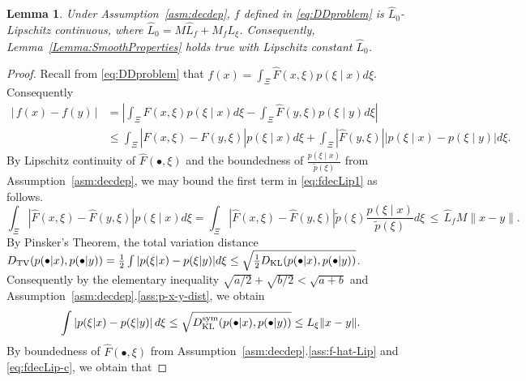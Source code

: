 \documentclass[11pt,reqno]{amsart}
\newcommand{\1}{{\bf 1}}
\newcommand{\2}{{\bf 2}}
\newcommand{\mr}[1]{{\color{blue}#1}}
\newcommand{\pc}[1]{{\color{cyan}#1}}
\newcommand{\us}[1]{\textcolor{red}{#1}}
\newcommand{\lln}{\left|}
\newcommand{\rrn}{\right|}
\numberwithin{equation}{section}
\newtheorem{lemma}{Lemma}[section]
\theoremstyle{remark}
\newcommand{\beq}{\begin{equation}}
\newcommand{\eeq}{\end{equation}}
\begin{document}
{{						
						\begin{lemma}\label{lem:f-decdep1-Lip}
							Under Assumption~\ref{asm:decdep}, $f$ defined in \eqref{eq:DDproblem} is $\hat{L}_0$-Lipschitz continuous, where $\hat{L}_0=M \hat{L}_f+M_fL_\xi$. Consequently, Lemma~\ref{Lemma:SmoothProperties} holds true with Lipschitz constant $\hat{L}_0$. %
						\end{lemma}
						\begin{proof}
						Recall from \eqref{eq:DDproblem} that $f(x)=\int_{\Xi} \hat{F}(x, \xi)p(\xi \mid  x) d\xi$. Consequently
						\begin{align}\label{eq:fdecLip1}
							|\, f(x)-f(y)\, |&=\left|\int_{\Xi} \hat{F}(x, \xi)p(\xi \mid  x) d\xi-\int_{\Xi} \hat{F}(y, \xi)p(\xi \mid  y) d\xi\right|\nonumber\\
							& \leq \int_\Xi\left|\hat{F}(x,\xi)-\hat{F}(y,\xi)\right| p(\xi\mid x) d\xi+\int_\Xi\left|\hat{F}(y,\xi)\right|\left|p(\xi \mid x)-p(\xi \mid y)\right|d\xi.
						\end{align}
						By Lipschitz continuity of $\hat{F}(\bullet,\xi)$ and the boundedness of $\frac{p(\xi\mid x)}{\tilde{p}(\xi)}$ from Assumption~\ref{asm:decdep}, we may bound the first term in \eqref{eq:fdecLip1} as follows.
						\beq\label{eq:fdecLip-a}
						\int_\Xi\left|\hat{F}(x,\xi)-\hat{F}(y,\xi)\right| p(\xi\mid x) d\xi=\int_\Xi\left|\hat{F}(x,\xi)-\hat{F}(y,\xi)\right|\tilde{p}(\xi) \frac{p(\xi\mid x)}{\tilde{p}(\xi)} d\xi \, \leq \,  \hat{L}_f M  {\|x-y\|}.
						\eeq
						By Pinsker's Theorem, the total variation distance $D_{\textnormal{TV}}(p(\bullet|x), p(\bullet|y)) =\frac{1}{2} \int |p(\xi|x) - p(\xi|y)| d\xi \leq \sqrt{\frac{1}{2} D_{\textnormal{KL}}(p(\bullet|x), p(\bullet|y))}$. Consequently by the elementary inequality $\sqrt{a/2}+\sqrt{b/2}<\sqrt{a+b}$ and Assumption~\ref{asm:decdep}.\ref{ass:p-x-y-dist}, we obtain
						\beq\label{eq:fdecLip-c}
						\int \lln p(\xi | x) - p(\xi|y) \rrn d\xi \leq \sqrt{D_{{\textnormal{KL}}}^{{\rm sym}}(p(\bullet |x), p(\bullet | y))} \leq L_\xi \|x-y\|. 
						\eeq
						By boundedness of $\hat{F}{(\bullet,\xi)}$ from Assumption~\ref{asm:decdep}.\ref{ass:f-hat-Lip} and \eqref{eq:fdecLip-c}, we obtain that

\end{proof}}}
\end{document}
